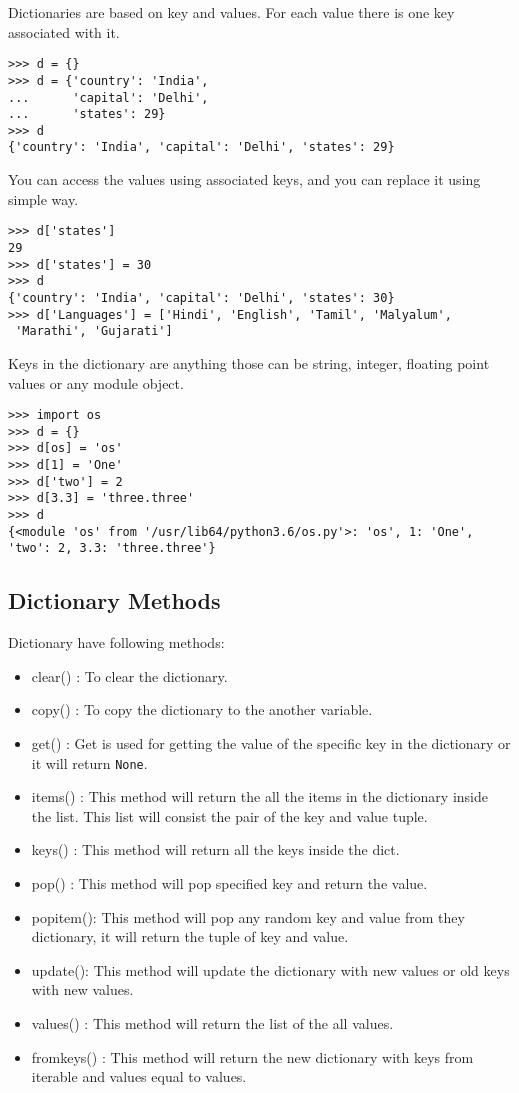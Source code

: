 \documentclass[letterpaper,12pt]{book}
\begin{document}
Dictionaries are based on key and values. For each value there is one  key associated with it. 
\begin{lstlisting}
>>> d = {}
>>> d = {'country': 'India', 
...      'capital': 'Delhi', 
...      'states': 29}
>>> d
{'country': 'India', 'capital': 'Delhi', 'states': 29}
\end{lstlisting}
You can access the values using associated keys, and you can replace it using simple way.
\begin{lstlisting}
>>> d['states']
29
>>> d['states'] = 30
>>> d
{'country': 'India', 'capital': 'Delhi', 'states': 30}
>>> d['Languages'] = ['Hindi', 'English', 'Tamil', 'Malyalum',
 'Marathi', 'Gujarati']

\end{lstlisting}
Keys in the dictionary are anything those can be string, integer, floating point values or any module object. 
\begin{lstlisting}
>>> import os
>>> d = {}
>>> d[os] = 'os'
>>> d[1] = 'One'
>>> d['two'] = 2
>>> d[3.3] = 'three.three'
>>> d
{<module 'os' from '/usr/lib64/python3.6/os.py'>: 'os', 1: 'One', 'two': 2, 3.3: 'three.three'}
\end{lstlisting}
\subsection{Dictionary Methods}
Dictionary have following methods:
\begin{itemize}
\item clear() : To clear the dictionary.
\item copy() : To copy the dictionary to the another variable.
\item get() : Get is used for getting the value of the specific key in the dictionary or it will return \texttt{None}.
\item items() : This method will return the all the items in the dictionary inside the list. This list will consist the pair of the key and value tuple.
\item keys() : This method will return all the keys inside the dict.
\item pop() : This method will pop specified key and return the value.
\item popitem(): This method will pop any random key and value from they dictionary, it will return the tuple of key and value.
\item update(): This method will update the dictionary with new values or old keys with new values.
\item values() : This method will return the list of the all values.
\item fromkeys() : This method will return the new dictionary with keys from iterable and values equal to values.
\end{itemize}
\end{document}

